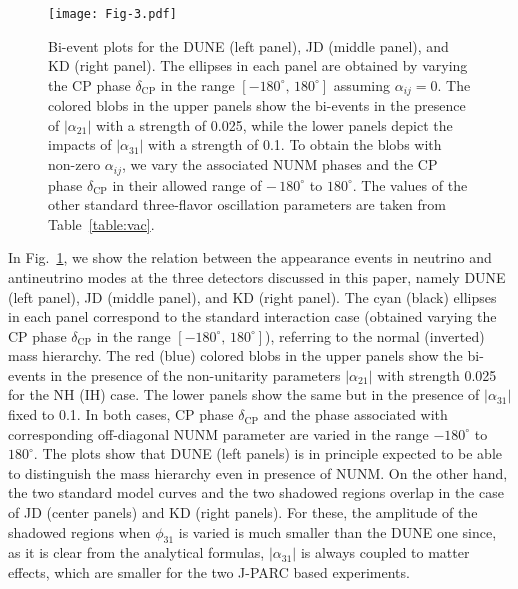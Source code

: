 \documentclass[11pt,a4paper]{article}
\newcommand{\capdef}{}
\newcommand{\mycaption}[2][\capdef]{\renewcommand{\capdef}{#2}
	\caption[#1]{{\footnotesize #2}}}
\begin{document}
\begin{figure}[h!]
\centering
\texttt{[image: Fig-3.pdf]}
\mycaption{Bi-event plots for the DUNE (left panel), JD (middle panel), and KD (right panel). The ellipses in each panel are obtained by varying the CP phase $\delta_{\mathrm{CP}}$ in the range $[-180^{\circ},\, 180^{\circ}]$ assuming $\alpha_{ij} = 0$. The colored blobs in the upper  panels show the bi-events in the presence of $|\alpha_{21}|$ with a strength of 0.025, while the lower panels depict the impacts of $|\alpha_{31}|$ with a strength of 0.1. To obtain the blobs with non-zero $\alpha_{ij}$,
	we vary the associated NUNM phases and the CP phase $\delta_{\mathrm{CP}}$ in their allowed range of $-\,180^{\circ}$ to $180^{\circ}$.
	 The values of the other standard three-flavor oscillation parameters are taken from Table~\ref{table:vac}.}
\label{fig:bi-event}
\end{figure}



In Fig.~\ref{fig:bi-event}, we show the relation between the appearance events in neutrino and antineutrino modes at the three detectors discussed in this paper, namely DUNE (left panel), JD (middle panel), and KD (right panel).
The cyan (black) ellipses in each panel correspond to the standard interaction case (obtained varying the CP phase $\delta_{\mathrm{CP}}$ in the range $[-180^{\circ},\, 180^{\circ}]$), referring to the  normal (inverted) mass hierarchy.
 The red (blue) colored blobs in the upper  panels show the bi-events in the presence of the non-unitarity parameters $|\alpha_{21}|$ with strength 0.025 for the NH (IH) case. The lower panels show the same but in the presence of $|\alpha_{31}|$ fixed to 0.1. In both cases, CP phase $\delta_{\mathrm{CP}}$ and the phase associated with corresponding off-diagonal NUNM parameter are varied in the range  $-180^{\circ}$ to $180^{\circ}$. 
The plots show that DUNE (left panels) is in principle expected to be able to distinguish the mass hierarchy even in presence of NUNM. On the other hand, the two standard model curves and the two shadowed regions overlap in the case of JD (center panels) and KD (right panels). For these, the amplitude of the shadowed regions when $\phi_{31}$ is varied is much smaller than the DUNE one since, as it is clear from the analytical formulas, $|\alpha_{31}|$ is always coupled to matter effects, which are smaller for the two J-PARC based experiments.
\end{document}

